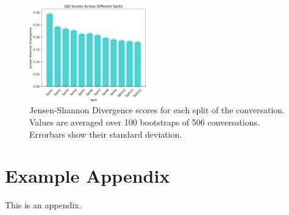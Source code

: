 \documentclass[11pt]{article}
\begin{document}
\begin{figure}
  \centering
  \includegraphics[width=0.45\textwidth]{figures/jsd_scores_splits}
  \caption{Jensen-Shannon Divergence scores for each split of the conversation. Values are averaged over 100 bootstraps of 506 conversations. Errorbars show their standard deviation.}
  \label{fig:jsd}
\end{figure}
%


\appendix

\section{Example Appendix}
\label{sec:appendix}

This is an appendix.
\end{document}
